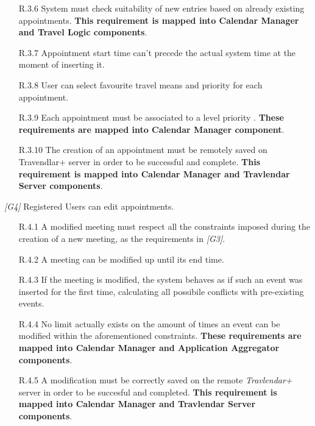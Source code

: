 \begin{description}
\begin{itemize}
			\item [R.3.6] System must check suitability of new entries based on already existing appointments.
			\textbf{This requirement is mapped into Calendar Manager and Travel Logic components}.

			\item [R.3.7] Appointment start time can't precede the actual system time at the moment of inserting it.

			\item [R.3.8] User can select favourite travel means and priority for each appointment.

			\item [R.3.9] Each appointment must be associated to a level priority	.
			\textbf{These requirements are mapped into Calendar Manager component}.

			\item [R.3.10] The creation of an appointment must be remotely saved on Travendlar+ server in order to be successful and complete.
			\textbf{This requirement is mapped into Calendar Manager and Travlendar Server components}.
		\end{itemize}


	\vskip0.75cm
	\item \textit{[G4]} Registered Users can edit appointments.
		 \begin{itemize}
			\item  [R.4.1] A modified meeting must respect all the constraints imposed during the creation of a new meeting, as the requirements in \textit{[G3]}.

		 	\item [R.4.2] A meeting can be modified up until its end time.

		 	\item [R.4.3] If the meeting is modified, the system behaves as if such an event was inserted for the first time, calculating all possibile conflicts with pre-existing events.

		 	\item [R.4.4] No limit actually exists on the amount of times an event can be modified within the aforementioned constraints.
		 	\textbf{These requirements are mapped into Calendar Manager and Application Aggregator components}.

		 	\item [R.4.5] A modification must be correctly saved on the remote \textit{Travlendar+} server in order to be succesful and completed.
			\textbf{This requirement is mapped into Calendar Manager and Travlendar Server components}.
			

\end{itemize}
\end{description}
